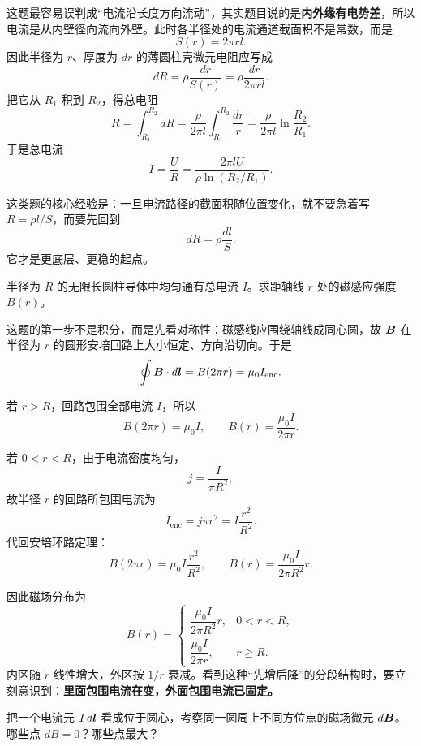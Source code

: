 \documentclass[lang=cn,11pt]{elegantbook}
\begin{document}
\begin{solution}
这题最容易误判成“电流沿长度方向流动”，其实题目说的是\textbf{内外缘有电势差}，所以电流是从内壁径向流向外壁。此时各半径处的电流通道截面积不是常数，而是
\[
S(r)=2\pi rl.
\]
因此半径为 \(r\)、厚度为 \(dr\) 的薄圆柱壳微元电阻应写成
\[
dR=\rho\frac{dr}{S(r)}=\rho\frac{dr}{2\pi rl}.
\]
把它从 \(R_1\) 积到 \(R_2\)，得总电阻
\[
R=\int_{R_1}^{R_2} dR
=\frac{\rho}{2\pi l}\int_{R_1}^{R_2}\frac{dr}{r}
=\frac{\rho}{2\pi l}\ln\frac{R_2}{R_1}.
\]
于是总电流
\[
I=\frac{U}{R}
=\frac{2\pi lU}{\rho\ln(R_2/R_1)}.
\]

这类题的核心经验是：一旦电流路径的截面积随位置变化，就不要急着写 \(R=\rho l/S\)，而要先回到
\[
dR=\rho\frac{dl}{S}.
\]
它才是更底层、更稳的起点。
\end{solution}

\begin{example}[无限长均匀载流圆柱体的磁场分布]
半径为 \(R\) 的无限长圆柱导体中均匀通有总电流 \(I\)。求距轴线 \(r\) 处的磁感应强度 \(B(r)\)。
\end{example}

\begin{solution}
这题的第一步不是积分，而是先看对称性：磁感线应围绕轴线成同心圆，故 \(\vb*{B}\) 在半径为 \(r\) 的圆形安培回路上大小恒定、方向沿切向。于是
\[
\oint \vb*{B}\cdot d\vb*{l}=B(2\pi r)=\mu_0I_{\mathrm{enc}}.
\]

若 \(r>R\)，回路包围全部电流 \(I\)，所以
\[
B(2\pi r)=\mu_0I,
\qquad
B(r)=\frac{\mu_0I}{2\pi r}.
\]

若 \(0<r<R\)，由于电流密度均匀，
\[
j=\frac{I}{\pi R^2},
\]
故半径 \(r\) 的回路所包围电流为
\[
I_{\mathrm{enc}}=j\pi r^2=I\frac{r^2}{R^2}.
\]
代回安培环路定理：
\[
B(2\pi r)=\mu_0I\frac{r^2}{R^2},
\qquad
B(r)=\frac{\mu_0I}{2\pi R^2}r.
\]

因此磁场分布为
\[
B(r)=
\begin{cases}
\dfrac{\mu_0I}{2\pi R^2}r, & 0<r<R,\\[6pt]
\dfrac{\mu_0I}{2\pi r}, & r\ge R.
\end{cases}
\]
内区随 \(r\) 线性增大，外区按 \(1/r\) 衰减。看到这种“先增后降”的分段结构时，要立刻意识到：\textbf{里面包围电流在变，外面包围电流已固定。}
\end{solution}

\begin{example}[电流元在不同方位点产生的磁场方向与大小]
把一个电流元 \(I\,d\vb*{l}\) 看成位于圆心，考察同一圆周上不同方位点的磁场微元 \(d\vb*{B}\)。哪些点 \(dB=0\)？哪些点最大？
\end{example}
\end{document}
